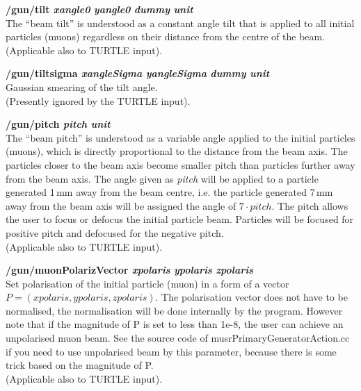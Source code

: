 \documentclass[twoside]{dis04}
\begin{document}
\begin{description}
\item{\bf /gun/tilt \emph{xangle0} \emph{yangle0} \emph{dummy} \emph{unit}}\\
	The ``beam tilt'' is understood as a constant angle tilt that is applied to
	all initial particles (muons) regardless on their distance from the centre of the beam.\\
	(Applicable also to TURTLE input).

\item{\bf /gun/tiltsigma \emph{xangleSigma} \emph{yangleSigma} \emph{dummy} \emph{unit}}\\
	Gaussian smearing of the tilt angle.\\
	(Presently ignored by the TURTLE input).

\item{\bf /gun/pitch \emph{pitch} \emph{unit}}\\
	The ``beam pitch'' is understood as a variable angle applied to the initial particles
        (muons), which is directly proportional to the distance from the beam axis.
	The particles closer to the beam axis become smaller pitch than particles further away
	from the beam axis.  
	The angle given as \emph{pitch} will be applied to a particle generated 1\,mm away from the
	beam centre, i.e. the particle generated 7\,mm away from the beam axis will be assigned
        the angle of $7\cdot pitch$.
	The pitch allows the user to focus or defocus the initial particle
	beam. Particles will be focused for positive pitch and defocused for the negative pitch.\\
	(Applicable also to TURTLE input).

\item{\bf /gun/muonPolarizVector \emph{xpolaris} \emph{ypolaris} \emph{zpolaris}}\\
	Set polarisation of the initial particle (muon) in a form of a vector 
	$P=(xpolaris,ypolaris,zpolaris)$.  The polarisation vector does not have to be normalised,
	the normalisation will be done internally by the program.
	However note that if the magnitude of P is set to less than 1e-8, the user can 
	achieve an unpolarised muon beam.  See the source code of musrPrimaryGeneratorAction.cc
	if you need to use unpolarised beam by this parameter, because there is some trick
        based on the magnitude of P.\\
	(Applicable also to TURTLE input).


\end{description}
\end{document}
